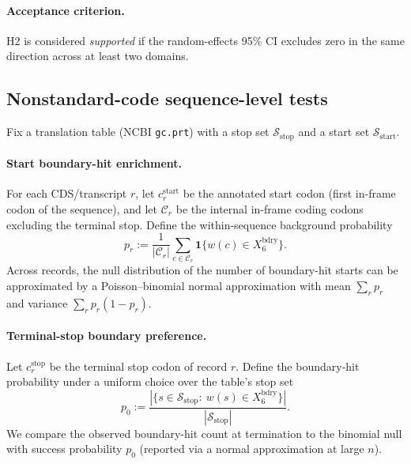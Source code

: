 \paragraph{Acceptance criterion.}
H2 is considered \emph{supported} if the random-effects 95\% CI excludes zero in the same direction across at least two domains.

\subsection{Nonstandard-code sequence-level tests}
\label{app:nonstandard_sequence_tests_protocols}

Fix a translation table (NCBI \texttt{gc.prt}) with a stop set $\mathcal{S}_{\mathrm{stop}}$ and a start set $\mathcal{S}_{\mathrm{start}}$.

\paragraph{Start boundary-hit enrichment.}
For each CDS/transcript $r$, let $c_r^{\mathrm{start}}$ be the annotated start codon (first in-frame codon of the sequence), and let $\mathcal{C}_r$ be the internal in-frame coding codons excluding the terminal stop.
Define the within-sequence background probability
\[
p_r := \frac{1}{|\mathcal{C}_r|}\sum_{c\in\mathcal{C}_r}\mathbf{1}\{w(c)\in X_6^{\mathrm{bdry}}\}.
\]
Across records, the null distribution of the number of boundary-hit starts can be approximated by a Poisson--binomial normal approximation with mean $\sum_r p_r$ and variance $\sum_r p_r(1-p_r)$.

\paragraph{Terminal-stop boundary preference.}
Let $c_r^{\mathrm{stop}}$ be the terminal stop codon of record $r$.
Define the boundary-hit probability under a uniform choice over the table's stop set
\[
p_0 := \frac{|\{s\in\mathcal{S}_{\mathrm{stop}}:\ w(s)\in X_6^{\mathrm{bdry}}\}|}{|\mathcal{S}_{\mathrm{stop}}|}.
\]
We compare the observed boundary-hit count at termination to the binomial null with success probability $p_0$ (reported via a normal approximation at large $n$).



